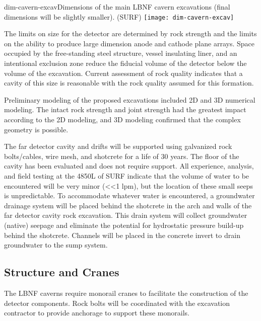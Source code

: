 \begin{cdrfigure}{dim-cavern-excav}{Dimensions of the main LBNF cavern excavations (final dimensions will be slightly smaller). (SURF) }
\texttt{[image: dim-cavern-excav]} 
\end{cdrfigure}

The limits on size for the detector are determined by rock strength and the limits on the ability to produce large dimension anode and cathode plane arrays. Space occupied by the free-standing steel structure, vessel insulating liner, and an intentional exclusion zone reduce the fiducial volume of the detector below the volume of the excavation. Current assessment of rock quality indicates that a cavity of this size is reasonable with the rock quality assumed for this formation.

Preliminary modeling of the proposed excavations included 2D and 3D numerical modeling. The intact rock strength and joint strength had the greatest impact according to the 2D modeling, and 3D modeling confirmed that the complex geometry is possible. 

The far detector cavity and drifts will be supported using galvanized rock bolts/cables, wire mesh, and shotcrete for a life of 30 years. The floor of the cavity has been evaluated and does not require support. All experience, analysis, and field testing at the 4850L of SURF indicate that the volume of water to be encountered will be very minor (<<1 lpm), but the location of these small seeps is unpredictable. To accommodate whatever water is encountered, a groundwater drainage system will be placed behind the shotcrete in the arch and walls of the far detector cavity rock excavation. This drain system will collect groundwater (native) seepage and eliminate the potential for hydrostatic pressure build-up behind the shotcrete. Channels will be placed in the concrete invert to drain groundwater to the sump system. 


\subsection{Structure and Cranes}
\label{sec:fscf-excav-cranes}

The LBNF caverns require monorail cranes to facilitate the construction of the detector components. Rock bolts will be coordinated with the excavation contractor to provide anchorage to support these monorails.

